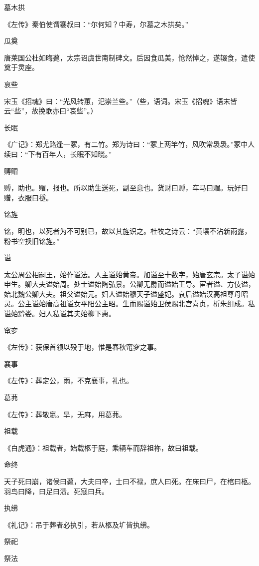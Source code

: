 \documentclass[a4paper,12pt,UTF8,twoside]{ctexbook}
\begin{document}
    墓木拱
    
    《左传》秦伯使谓褰叔曰：“尔何知？中寿，尔墓之木拱矣。”
    
    瓜奠
    
    唐莱国公杜如晦薨，太宗诏虞世南制碑文。后因食瓜美，怆然悼之，遂辍食，遣使奠于灵座。
    
    哀些
    
    宋玉《招魂》曰：“光风转蕙，汜崇兰些。”（些，语词。宋玉《招魂》语末皆云“些”，故挽歌亦曰“哀些”。）
    
    长眠
    
    《广记》：郑尤路逢一冢，有二竹。郑为诗曰：“冢上两竿竹，风吹常袅袅。”冢中人续曰：“下有百年人，长眠不知晓。”
    
    赙赗
    
    赙，助也。赗，报也。所以助生送死，副至意也。货财曰赙，车马曰赗。玩好曰赠，衣服曰襚。
    
    铭旌
    
    铭，明也，以死者为不可别已，故以其旌识之。杜牧之诗云：“黄壤不沾新雨露，粉书空换旧铭旌。”
    
    谥
    
    太公周公相嗣王，始作谥法。人主谥始黄帝。加谥至十数字，始唐玄宗。太子谥始申生。卿大夫谥始周。处士谥始陶弘景。公卿无爵而谥始王导。宦者谥、方伎谥，始北魏公卿大夫。祖父谥始元。妇人谥始穆天子谥盛妃。哀后谥始汉高祖尊母昭灵。公主谥始唐高祖谥女平阳公主昭。生而赐谥始卫侯赐北宫喜贞，析朱组成。私谥始黔娄。妇人私谥其夫始柳下惠。
    
    窀穸
    
    《左传》：获保首领以殁于地，惟是春秋窀穸之事。
    
    襄事
    
    《左传》：葬定公，雨，不克襄事，礼也。
    
    葛茀
    
    《左传》：葬敬嬴。旱，无麻，用葛茀。
    
    祖载
    
    《白虎通》：祖载者，始载柩于庭，乘辆车而辞祖祢，故曰祖载。
    
    命终
    
    天子死曰崩，诸侯曰薨，大夫曰卒，士曰不禄，庶人曰死。在床曰尸，在棺曰柩。羽鸟曰降，曰足曰渍。死寇曰兵。
    
    执绋
    
    《礼记》：吊于葬者必执引，若从柩及圹皆执绋。
    
    祭祀
    
    祭法
    
\end{document}
